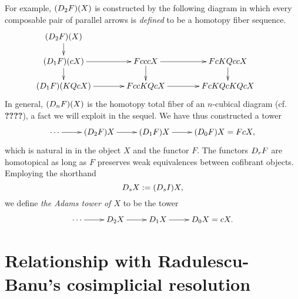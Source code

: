 \documentclass[11pt]{amsart}
\theoremstyle{plain}
\newcommand{\dupdown}[2]{D_{\smash{#1}}}
\begin{document}
For example, $(\dupdown{2}{c}F)(X)$ is constructed by the following diagram in which every composable pair of parallel arrows is \emph{defined} to be a homotopy fiber sequence.
\[\def\labelstyle{\scriptstyle}
\xymatrix@!0@R=30pt@C=50pt{
(\dupdown{2}{c}F)(X)\ar[d]\\
(\dupdown{1}{c}F)(cX) \ar[rr]\ar[d]         &           &FcccX \ar[rr]\ar[d]         &           &   FcKQccX            \ar[d]  &                  \\
(\dupdown{1}{c}F)(KQcX) \ar[rr] &                     &  FccKQcX \ar[rr] &             & FcKQcKQcX
}\]
In general, $(\dupdown{n}{c}F)(X)$ is the homotopy total fiber of an $n$-cubical diagram (cf. \textbf{????}), a fact we will exploit in the sequel. We have thus constructed a tower
\[\xymatrix@R=4mm{
\cdots 
\ar[r]
&%
(\dupdown{2}{c}F)X
\ar[r]
&%
(\dupdown{1}{c}F)X
\ar[r]&%
(\dupdown{0}{c}F)X=FcX,
}\]
which is natural in in the object $X$ and the functor $F$.
The functors $\dupdown{r}{c}F$ are homotopical as long as $F$ preserves weak equivalences between cofibrant objects. Employing the shorthand
\[\dupdown{s}{c}X:=(\dupdown{s}{c}I)X,\]
we define \emph{the Adams tower of $X$} to be the tower
\[\xymatrix@R=4mm{
\cdots 
\ar[r]
&%
\dupdown{2}{c}X
\ar[r]
&%
\dupdown{1}{c}X
\ar[r]&%
\dupdown{0}{c}X=cX.
}\]

\section{Relationship with Radulescu-Banu's cosimplicial resolution}\label{sec:relnWithRB}
\end{document}
